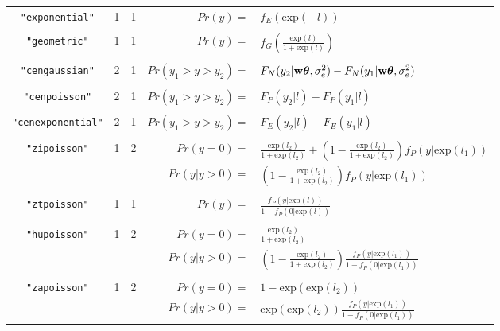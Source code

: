 \documentclass{article}
\begin{document}
\begin{landscape}
\begin{longtable}{cccrl}
   \texttt{"exponential"}         &  1  &   1  &         $Pr(y)=$&$ f_{E}(\textrm{exp}(-l))$\\      
&&&&\\
   \texttt{"geometric"}         &  1  &   1  &         $Pr(y)=$&$ f_{G}(\frac{\textrm{exp}(l)}{1+\textrm{exp}(l)})$\\      
&&&&\\
   \texttt{"cengaussian"}        &  2 &   1  &        $Pr(y_{1}>y>y_{2}) =$&$ F_{N}(y_{2} | {\bf w}{\bm \theta},\sigma^{2}_{e})-F_{N}( y_{1} | {\bf w}{\bm \theta},\sigma^{2}_{e})$\\
&&&&\\
   \texttt{"cenpoisson"}        &  2  &   1  &        $Pr(y_{1}>y>y_{2}) =$&$ F_{P}(y_{2} | l)-F_{P}(y_{1} | l)$\\
&&&&\\
   \texttt{"cenexponential"}     &2    &  1  &          $Pr(y_{1}>y>y_{2}) =$&$ F_{E}(y_{2} | l)-F_{E}(y_{1} | l)$\\  
&&&&\\  
   \texttt{"zipoisson"}        &  1  &   2  &     $Pr(y=0) =$&$ \frac{\textrm{exp}(l_{2})}{1+\textrm{exp}(l_{2})}+\left(1-\frac{\textrm{exp}(l_{2})}{1+\textrm{exp}(l_{2})}\right)f_{P}(y|\textrm{exp}(l_{1}))$\\     
                                              &    &       & $Pr(y | y>0) =$&$ \left(1-\frac{\textrm{exp}(l_{2})}{1+\textrm{exp}(l_{2})}\right)f_{P}(y |\textrm{exp}(l_{1}))$\\      
&&&&\\
   \texttt{"ztpoisson"}         &  1  &   1  &         $Pr(y)=$&$ \frac{f_{P}(y |\textrm{exp}(l))}{1-f_{P}(0 |\textrm{exp}(l))}$\\      
&&&&\\
   \texttt{"hupoisson"}        &  1  &   2  &     $Pr(y=0) =$&$ \frac{\textrm{exp}(l_{2})}{1+\textrm{exp}(l_{2})}$\\     
                               &    &       & $Pr(y | y>0) =$&$\left(1-\frac{\textrm{exp}(l_{2})}{1+\textrm{exp}(l_{2})}\right)\frac{f_{P}(y |\textrm{exp}(l_{1}))}{1-f_{P}(0 |\textrm{exp}(l_{1}))}$\\      
&&&&\\
   \texttt{"zapoisson"}        &  1  &   2  &     $Pr(y=0) =$&$1-\textrm{exp}(\textrm{exp}(l_{2}))$\\     
                               &    &       & $Pr(y | y>0) =$&$ \textrm{exp}(\textrm{exp}(l_{2}))\frac{f_{P}(y |\textrm{exp}(l_{1}))}{1-f_{P}(0 |\textrm{exp}(l_{1}))}$\\      

\end{longtable}
\end{landscape}
\end{document}
